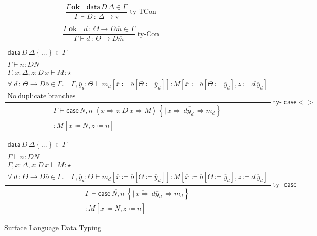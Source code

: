 \begin{figure}
\[
\frac{\Gamma\,\mathbf{ok}\quad\mathsf{data}\,D\,\Delta\in\Gamma}{\Gamma\vdash D\,:\,\Delta\rightarrow\star}\operatorname{ty-TCon}
\]

\[
\frac{\Gamma\,\mathbf{ok}\quad d\,:\,\varTheta\rightarrow D\overline{m}\in\Gamma}{\Gamma\vdash d\,:\,\varTheta\rightarrow D\overline{m}}\operatorname{ty-Con}
\]

\[
\frac{\begin{array}{c}
\mathsf{data}\,D\,\Delta\left\{ ...\right\} \in\Gamma\\
\Gamma\vdash n:D\overline{N}\\
\Gamma,\overline{x}:\Delta,z:D\,\overline{x}\vdash M:\star\\
\forall\:d\,:\,\varTheta\rightarrow D\overline{o}\in\Gamma.\quad\Gamma,\overline{y}_{d}:\varTheta\vdash m_{d}\left[\overline{x}\coloneqq\overline{o}\left[\varTheta\coloneqq\overline{y}_{d}\right]\right]:M\left[\overline{x}\coloneqq\overline{o}\left[\varTheta\coloneqq\overline{y}_{d}\right],z\coloneqq d\,\overline{y}_{d}\right]\\
\mathrm{No\ duplicate\ branches}
\end{array}}{\begin{array}{c}
\Gamma\vdash\mathsf{case}\,\overline{N,}n\,\left\langle \overline{x\Rightarrow}z:D\,\overline{x}\Rightarrow M\right\rangle \left\{ \overline{|\,\overline{x\Rightarrow}\,d\overline{y}_{d}\,\Rightarrow m_{d}}\right\} \\
:M\left[\overline{x}\coloneqq\overline{N},z\coloneqq n\right]
\end{array}}\operatorname{ty-}\mathsf{case}<>
\]

\[
\frac{\begin{array}{c}
\mathsf{data}\,D\,\Delta\left\{ ...\right\} \in\Gamma\\
\Gamma\vdash n:D\overline{N}\\
\Gamma,\overline{x}:\Delta,z:D\,\overline{x}\vdash M:\star\\
\forall\:d\,:\,\varTheta\rightarrow D\overline{o}\in\Gamma.\quad\Gamma,\overline{y}_{d}:\varTheta\vdash m_{d}\left[\overline{x}\coloneqq\overline{o}\left[\varTheta\coloneqq\overline{y}_{d}\right]\right]:M\left[\overline{x}\coloneqq\overline{o}\left[\varTheta\coloneqq\overline{y}_{d}\right],z\coloneqq d\,\overline{y}_{d}\right]
\end{array}}{\begin{array}{c}
\Gamma\vdash\mathsf{case}\,\overline{N,}n\,\left\{ \overline{|\,\overline{x\Rightarrow}\,d\overline{y}_{d}\,\Rightarrow m_{d}}\right\} \\
:M\left[\overline{x}\coloneqq\overline{N},z\coloneqq n\right]
\end{array}}\operatorname{ty-}\mathsf{case}
\]

\caption{Surface Language Data Typing}
\label{fig:surface-data-ty}
\end{figure}

